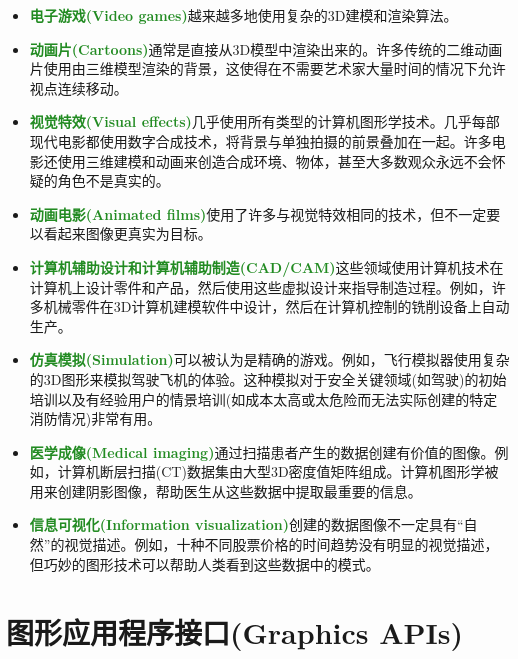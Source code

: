 \begin{itemize}
	\item \textbf{\textcolor{ForestGreen}{电子游戏(Video games)}}越来越多地使用复杂的3D建模和渲染算法。
	
	\item \textbf{\textcolor{ForestGreen}{动画片(Cartoons)}}通常是直接从3D模型中渲染出来的。许多传统的二维动画片使用由三维模型渲染的背景，这使得在不需要艺术家大量时间的情况下允许视点连续移动。
	
	\item \textbf{\textcolor{ForestGreen}{视觉特效(Visual effects)}}几乎使用所有类型的计算机图形学技术。几乎每部现代电影都使用数字合成技术，将背景与单独拍摄的前景叠加在一起。许多电影还使用三维建模和动画来创造合成环境、物体，甚至大多数观众永远不会怀疑的角色不是真实的。

	\item \textbf{\textcolor{ForestGreen}{动画电影(Animated films)}}使用了许多与视觉特效相同的技术，但不一定要以看起来图像更真实为目标。
	
	\item \textbf{\textcolor{ForestGreen}{计算机辅助设计和计算机辅助制造(CAD/CAM)}}这些领域使用计算机技术在计算机上设计零件和产品，然后使用这些虚拟设计来指导制造过程。例如，许多机械零件在3D计算机建模软件中设计，然后在计算机控制的铣削设备上自动生产。
	
	\item \textbf{\textcolor{ForestGreen}{仿真模拟(Simulation)}}可以被认为是精确的游戏。例如，飞行模拟器使用复杂的3D图形来模拟驾驶飞机的体验。这种模拟对于安全关键领域(如驾驶)的初始培训以及有经验用户的情景培训(如成本太高或太危险而无法实际创建的特定消防情况)非常有用。
	
	\item \textbf{\textcolor{ForestGreen}{医学成像(Medical imaging)}}通过扫描患者产生的数据创建有价值的图像。例如，计算机断层扫描(CT)数据集由大型3D密度值矩阵组成。计算机图形学被用来创建阴影图像，帮助医生从这些数据中提取最重要的信息。
	
	\item \textbf{\textcolor{ForestGreen}{信息可视化(Information visualization)}}创建的数据图像不一定具有“自然”的视觉描述。例如，十种不同股票价格的时间趋势没有明显的视觉描述，但巧妙的图形技术可以帮助人类看到这些数据中的模式。
\end{itemize}


\section{图形应用程序接口(Graphics APIs)}

